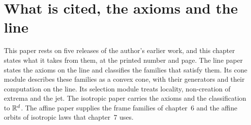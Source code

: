%
%

\chapter{What is cited, the axioms and the line}
\label{ch:cited}

This paper rests on five releases of the author's earlier work, and this chapter states what it
takes from them, at the printed number and page. The line paper  states the
axioms on the line and classifies the families that satisfy them. Its cone module
 describes these families as a convex cone, with their generators and their
computation on the line. Its selection module  treats locality,
non-creation of extrema and the jet. The isotropic paper  carries the axioms
and the classification to $\mathbb{R}^d$. The affine paper  supplies the frame
families of chapter~6 and the affine orbits of isotropic laws that chapter~7 uses.

